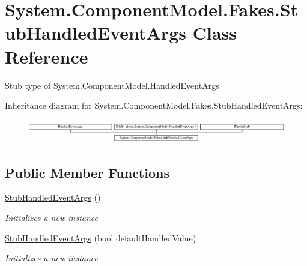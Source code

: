 \hypertarget{class_system_1_1_component_model_1_1_fakes_1_1_stub_handled_event_args}{\section{System.\-Component\-Model.\-Fakes.\-Stub\-Handled\-Event\-Args Class Reference}
\label{class_system_1_1_component_model_1_1_fakes_1_1_stub_handled_event_args}
}


Stub type of System.\-Component\-Model.\-Handled\-Event\-Args 


Inheritance diagram for System.\-Component\-Model.\-Fakes.\-Stub\-Handled\-Event\-Args\-:\begin{figure}[H]
\begin{center}
\leavevmode
\includegraphics[height=1.031308cm]{class_system_1_1_component_model_1_1_fakes_1_1_stub_handled_event_args}
\end{center}
\end{figure}
\subsection*{Public Member Functions}
\begin{DoxyCompactItemize}
\item 
\hyperlink{class_system_1_1_component_model_1_1_fakes_1_1_stub_handled_event_args_a7307e4f8183f1d5694a9aa647796004a}{Stub\-Handled\-Event\-Args} ()
\begin{DoxyCompactList}\small\item\em Initializes a new instance\end{DoxyCompactList}\item 
\hyperlink{class_system_1_1_component_model_1_1_fakes_1_1_stub_handled_event_args_a85b0122d92535b480258004e2320d1f5}{Stub\-Handled\-Event\-Args} (bool default\-Handled\-Value)
\begin{DoxyCompactList}\small\item\em Initializes a new instance\end{DoxyCompactList}\end{DoxyCompactItemize}
